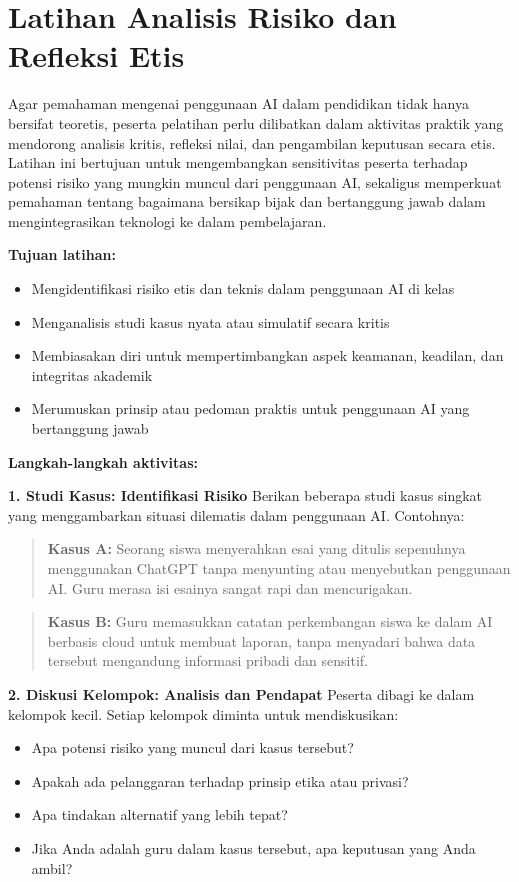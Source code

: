 \section{Latihan Analisis Risiko dan Refleksi Etis}

Agar pemahaman mengenai penggunaan AI dalam pendidikan tidak hanya bersifat teoretis, peserta pelatihan perlu dilibatkan dalam aktivitas praktik yang mendorong analisis kritis, refleksi nilai, dan pengambilan keputusan secara etis. Latihan ini bertujuan untuk mengembangkan sensitivitas peserta terhadap potensi risiko yang mungkin muncul dari penggunaan AI, sekaligus memperkuat pemahaman tentang bagaimana bersikap bijak dan bertanggung jawab dalam mengintegrasikan teknologi ke dalam pembelajaran.

\textbf{Tujuan latihan:}
\begin{itemize}
	\item Mengidentifikasi risiko etis dan teknis dalam penggunaan AI di kelas
	\item Menganalisis studi kasus nyata atau simulatif secara kritis
	\item Membiasakan diri untuk mempertimbangkan aspek keamanan, keadilan, dan integritas akademik
	\item Merumuskan prinsip atau pedoman praktis untuk penggunaan AI yang bertanggung jawab
\end{itemize}

\textbf{Langkah-langkah aktivitas:}

\textbf{1. Studi Kasus: Identifikasi Risiko}
Berikan beberapa studi kasus singkat yang menggambarkan situasi dilematis dalam penggunaan AI. Contohnya:

\begin{quote}
	\textbf{Kasus A:} Seorang siswa menyerahkan esai yang ditulis sepenuhnya menggunakan ChatGPT tanpa menyunting atau menyebutkan penggunaan AI. Guru merasa isi esainya sangat rapi dan mencurigakan.
\end{quote}

\begin{quote}
	\textbf{Kasus B:} Guru memasukkan catatan perkembangan siswa ke dalam AI berbasis cloud untuk membuat laporan, tanpa menyadari bahwa data tersebut mengandung informasi pribadi dan sensitif.
\end{quote}

\textbf{2. Diskusi Kelompok: Analisis dan Pendapat}
Peserta dibagi ke dalam kelompok kecil. Setiap kelompok diminta untuk mendiskusikan:
\begin{itemize}
	\item Apa potensi risiko yang muncul dari kasus tersebut?
	\item Apakah ada pelanggaran terhadap prinsip etika atau privasi?
	\item Apa tindakan alternatif yang lebih tepat?
	\item Jika Anda adalah guru dalam kasus tersebut, apa keputusan yang Anda ambil?
\end{itemize}

